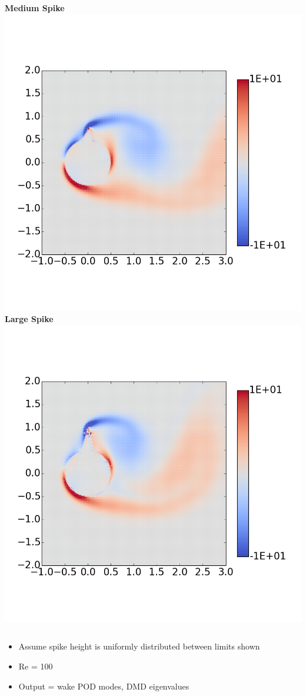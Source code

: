 \documentclass[9pt]{beamer}
\begin{document}
\begin{frame}
\begin{columns}[c]
   \centering
    \textbf{Medium Spike} \\
    \includegraphics[width=1\textwidth]{PerturbMediumHorn}
   \centering
    \textbf{Large Spike} \\
    \includegraphics[width=1\textwidth]{PerturbBigHorn}
\end{columns}
\begin{itemize}
\item Assume spike height is uniformly distributed between limits shown
\item Re = 100
\item Output = wake POD modes, DMD eigenvalues
\end{itemize}
\end{frame}
\end{document}
